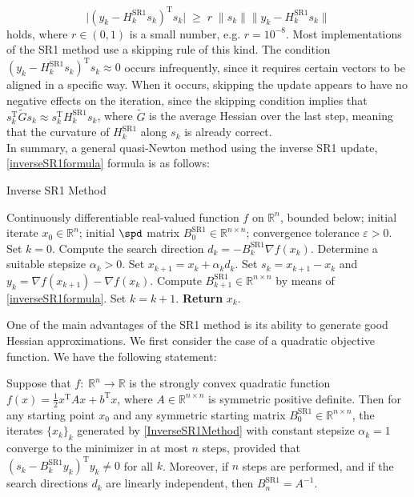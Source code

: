 \begin{equation}\label{CautiousSR1}
    \lvert (y_k - H^\mathrm{SR1}_k s_k)^{\mathrm{T}} s_k \lvert \; \geq \; r \; \lVert s_k \rVert \lVert y_k - H^\mathrm{SR1}_k s_k \rVert 
\end{equation}
holds, where $r \in (0, 1)$ is a small number, e.g. $r = 10^{−8}$. Most implementations of the SR1 method use a skipping rule of this kind. The condition $(y_k - H^\mathrm{SR1}_k s_k)^{\mathrm{T}} s_k \approx 0$ occurs infrequently, since it requires certain vectors to be aligned in a specific way. When it occurs, skipping the update appears to have no negative effects on the iteration, since the skipping condition implies that $s^{\mathrm{T}}_k \tilde{G} s_k \approx s^{\mathrm{T}}_k H^\mathrm{SR1}_k s_k$, where $\tilde{G}$ is the average Hessian over the last step, meaning that the curvature of $H^\mathrm{SR1}_k$ along $s_k$ is already correct. \\
In summary, a general quasi-Newton method using the inverse SR1 update, \cref{inverseSR1formula} formula is as follows:
\begin{algorithm}[H]
    \caption{Inverse SR1 Method}\label{InverseSR1Method}
    \begin{algorithmic}[1]
        \State Continuously differentiable real-valued function $f$ on $\mathbb{R}^n$, bounded below; initial iterate $x_0 \in \mathbb{R}^n$; initial $\spd$ matrix $B^{\mathrm{SR1}}_0 \in \mathbb{R}^{n \times n}$; convergence tolerance $\varepsilon > 0$. Set $k = 0$.
            \State Compute the search direction $d_k = - B^{\mathrm{SR1}}_k \nabla f(x_k)$.
            \State Determine a suitable stepsize $\alpha_k > 0$.
            \State Set $x_{k+1} = x_k + \alpha_k d_k$.
            \State Set $s_k = x_{k+1} - x_k$ and $y_k = \nabla f(x_{k+1}) - \nabla f(x_k)$.
            \State Compute $B^{\mathrm{SR1}}_{k+1} \in \mathbb{R}^{n \times n}$ by means of \cref{inverseSR1formula}. 
            \State Set $k = k+1$.
        \EndWhile
        \State \textbf{Return} $x_k$.
    \end{algorithmic}
\end{algorithm}
One of the main advantages of the SR1 method is its ability to generate good Hessian approximations. We first consider the case of a quadratic objective function. We have the following statement:
\begin{theorem}
    Suppose that $f \colon \; \mathbb{R}^n \to \mathbb{R}$ is the strongly convex quadratic function $f(x) = \frac{1}{2} x^{\mathrm{T}} A x + b^{\mathrm{T}} x$, where $A \in \mathbb{R}^{n \times n}$ is symmetric positive definite. Then for any starting point $x_0$ and any symmetric starting matrix $B^{\mathrm{SR1}}_0 \in \mathbb{R}^{n \times n}$, the iterates $\{x_k\}_k$ generated by \cref{InverseSR1Method} with constant stepsize $\alpha_k = 1$ converge to the minimizer in at most $n$ steps, provided that $(s_k - B^\mathrm{SR1}_k y_k)^{\mathrm{T}} y_k \neq 0$ for all $k$. Moreover, if $n$ steps are performed, and if the search directions $d_k$ are linearly independent, then $B^{\mathrm{SR1}}_n = A^{−1}$.
\end{theorem}
